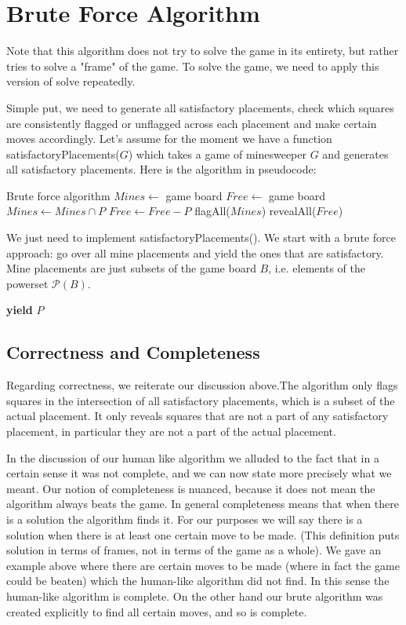 \documentclass{article}
\theoremstyle{definition}
\theoremstyle{definition}
\theoremstyle{theorem}
\begin{document}
	\section*{Brute Force Algorithm}
	Note that this algorithm does not try to solve the game in its entirety, but rather tries to solve a "frame" of the game. To solve the game, we need to apply this version of solve repeatedly.
	
	 Simple put, we need to generate all satisfactory placements, check which squares are consistently flagged or unflagged across each placement and make certain moves accordingly. Let's assume for the moment we have a function satisfactoryPlacements($G$) which takes a game of minesweeper $G$ and generates all satisfactory placements. Here is the algorithm in pseudocode:
	\begin{algorithmic}
		  \Comment Brute force algorithm
		\State $Mines \gets$ game board
		\State $Free \gets$ game board
		\State $Mines \gets Mines \cap P$
		\State $Free \gets Free -  P$
		\EndFor
		\State flagAll($Mines$)
		\State revealAll($Free$)
		\EndFunction
	\end{algorithmic}
	We just need to implement satisfactoryPlacements(). We start with a brute force approach: go over all mine placements and yield the ones that are satisfactory. Mine placements are just subsets of the game board $B$, i.e. elements of the powerset $\mathcal{P}(B)$.
	
	\begin{algorithmic}
		\Function{satisfactoryPlacements}{$G$}
		\For{$P$ in $\mathcal{P}(B)$}
		\If{$P$ is satisfactory}
		\State \textbf{yield} $P$
		\EndIf
		\EndFor
		\EndFunction
	\end{algorithmic}
	
	\subsection*{Correctness and Completeness}
	Regarding correctness, we reiterate our discussion above.The algorithm only flags squares in the intersection of all satisfactory placements, which is a subset of the actual placement. It only reveals squares that are not a part of any satisfactory placement, in particular they are not a part of the actual placement.
	
	In the discussion of our human like algorithm we alluded to the fact that in a certain sense it was not complete, and we can now state more precisely what we meant. Our notion of completeness is nuanced, because it does not mean the algorithm always beats the game. In general completeness means that when there is a solution the algorithm finds it. For our purposes we will say there is a solution when there is at least one certain move to be made. (This definition puts solution in terms of frames, not in terms of the game as a whole). We gave an example above where there are certain moves to be made (where in fact the game could be beaten) which the human-like algorithm did not find. In this sense the human-like algorithm is complete. On the other hand our brute algorithm was created explicitly to find all certain moves, and so is complete.
	
\end{document}
